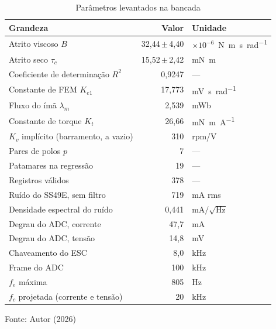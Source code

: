 \begin{table}[H]
    \centering
    \caption{Parâmetros levantados na bancada}
    \label{tab:bancada_parametros}
    \small
    \begin{tabular}{lrl}
        \toprule
        \textbf{Grandeza} & \textbf{Valor} & \textbf{Unidade} \\
        \midrule
        Atrito viscoso $B$ & 32{,}44\,$\pm$\,4{,}40 & $\times 10^{-6}$~\si{\newton\meter\second\per\radian} \\
        Atrito seco $\tau_c$ & 15{,}52\,$\pm$\,2{,}42 & \si{\milli\newton\meter} \\
        Coeficiente de determinação $R^2$ & 0{,}9247 & --- \\
        Constante de FEM $K_{e1}$ & 17{,}773 & \si{\milli\volt\second\per\radian} \\
        Fluxo do ímã $\lambda_m$ & 2{,}539 & \si{\milli\weber} \\
        Constante de torque $K_t$ & 26{,}66 & \si{\milli\newton\meter\per\ampere} \\
        $K_v$ implícito (barramento, a vazio) & 310 & rpm/\si{\volt} \\
        Pares de polos $p$ & 7 & --- \\
        Patamares na regressão & 19 & --- \\
        Registros válidos & 378 & --- \\
        \midrule
        Ruído do SS49E, sem filtro & 719 & \si{\milli\ampere} rms \\
        Densidade espectral do ruído & 0{,}441 & \si{\milli\ampere}$/\sqrt{\si{\hertz}}$ \\
        Degrau do ADC, corrente & 47{,}7 & \si{\milli\ampere} \\
        Degrau do ADC, tensão & 14{,}8 & \si{\milli\volt} \\
        Chaveamento do ESC & 8{,}0 & \si{\kilo\hertz} \\
        Frame do ADC & 100 & \si{\kilo\hertz} \\
        $f_e$ máxima & 805 & \si{\hertz} \\
        $f_c$ projetada (corrente e tensão) & 20 & \si{\kilo\hertz} \\
        \bottomrule
    \end{tabular}


    \vspace{2pt}
    {\small Fonte: Autor (2026)}
\end{table}

